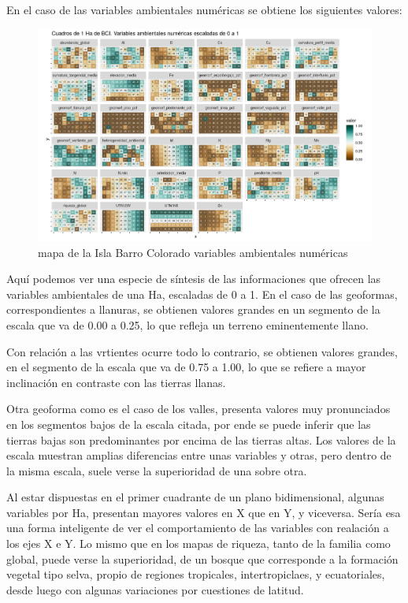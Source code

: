 \documentclass[11pt,]{article}
\begin{document}
En el caso de las variables ambientales numéricas se obtiene los
siguientes valores:

\begin{figure}
\centering
\includegraphics[width=1.00000\textwidth]{mapas_variables_ambientales_numericas.png}
\caption{mapa de la Isla Barro Colorado variables ambientales numéricas
\label{fig:bci_map}}
\end{figure}

Aquí podemos ver una especie de síntesis de las informaciones que
ofrecen las variables ambientales de una Ha, escaladas de 0 a 1. En el
caso de las geoformas, correspondientes a llanuras, se obtienen valores
grandes en un segmento de la escala que va de 0.00 a 0.25, lo que
refleja un terreno eminentemente llano.

Con relación a las vrtientes ocurre todo lo contrario, se obtienen
valores grandes, en el segmento de la escala que va de 0.75 a 1.00, lo
que se refiere a mayor inclinación en contraste con las tierras llanas.

Otra geoforma como es el caso de los valles, presenta valores muy
pronunciados en los segmentos bajos de la escala citada, por ende se
puede inferir que las tierras bajas son predominantes por encima de las
tierras altas. Los valores de la escala muestran amplias diferencias
entre unas variables y otras, pero dentro de la misma escala, suele
verse la superioridad de una sobre otra.

Al estar dispuestas en el primer cuadrante de un plano bidimensional,
algunas variables por Ha, presentan mayores valores en X que en Y, y
viceversa. Sería esa una forma inteligente de ver el comportamiento de
las variables con realación a los ejes X e Y. Lo mismo que en los mapas
de riqueza, tanto de la familia como global, puede verse la
superioridad, de un bosque que corresponde a la formación vegetal tipo
selva, propio de regiones tropicales, intertropiclaes, y ecuatoriales,
desde luego con algunas variaciones por cuestiones de latitud.
\end{document}
